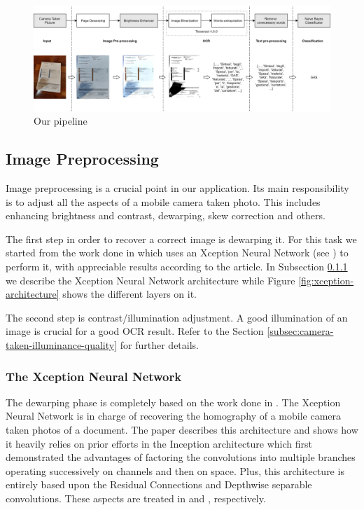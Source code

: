 \documentclass[10pt,twocolumn,letterpaper]{article}
\begin{document}
\begin{figure}[!ht]
  \centering
  \includegraphics[width=1.0\textwidth]{images/pipeline.png}
  \caption{Our pipeline}
  \label{fig:pipeline}
\end{figure}

\subsection{Image Preprocessing}

Image preprocessing is a crucial point in our application. Its main
responsibility is to adjust all the aspects of a mobile camera taken
photo. This includes enhancing brightness and contrast, dewarping,
skew correction and others.

The first step in order to recover a correct image is dewarping
it. For this task we started from the work done in \cite{Korber18}
which uses an Xception Neural Network (see \cite{Xception}) to perform
it, with appreciable results according to the article. In Subsection
\ref{subsec:xception-nn-architecture} we describe the Xception Neural
Network architecture while Figure \ref{fig:xception-architecture}
shows the different layers on it.

The second step is contrast/illumination adjustment. A good
illumination of an image is crucial for a good OCR result. Refer to
the Section \ref{subsec:camera-taken-illuminance-quality} for further
details.

\subsubsection{The Xception Neural Network}
\label{subsec:xception-nn-architecture}

The dewarping phase is completely based on the work done in
\cite{Korber18}. The Xception Neural Network is in charge of
recovering the homography of a mobile camera taken photos of a
document. The paper \cite{Xception} describes this architecture and
shows how it heavily relies on prior efforts in the Inception
architecture which first demonstrated the advantages of factoring the
convolutions into multiple branches operating successively on channels
and then on space. Plus, this architecture is entirely based upon the
Residual Connections and Depthwise separable convolutions. These
aspects are treated in \cite{Sahoo17} and \cite{Wang18}, respectively.
\end{document}
